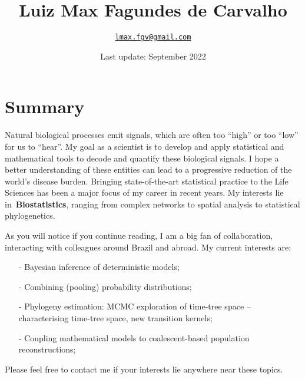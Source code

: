 \documentclass[10pt]{article}
\title{\bfseries Luiz Max Fagundes de Carvalho}
\author{\href{mailto:lmax.fgc@gmail.com}{\nolinkurl{lmax.fgv@gmail.com}}}
\affil{School of Applied Mathematics (EMAp), Get\'ulio Vargas Foundation, Brazil.}
\date{Last update: September 2022}
\begin{document}
\maketitle

\section*{Summary}

Natural biological processes emit signals, which are often too ``high'' or too ``low'' for us to ``hear''.
My goal as a scientist is to develop and apply statistical and mathematical tools to decode and quantify these biological signals.
I hope a better understanding of these entities can lead to a progressive reduction of the world's disease burden.
Bringing state-of-the-art statistical practice to the Life Sciences has been a major focus of my career in recent years.
My interests lie in~\textbf{Biostatistics}, ranging from complex networks to spatial analysis to statistical phylogenetics.


As you will notice if you continue reading, I am a big fan of collaboration, interacting with colleagues around Brazil and abroad.
My current interests are:
\begin{itemize}
\itemsep0.1em
 \item [-] Bayesian inference of deterministic models;
 \item [-] Combining (pooling) probability distributions;
 \item [-] Phylogeny estimation: MCMC exploration of time-tree space -- characterising time-tree space, new transition kernels;
 \item [-] Coupling mathematical models to coalescent-based population reconstructions;
\end{itemize}

Please feel free to contact me if your interests lie anywhere near these topics.
\end{document}
